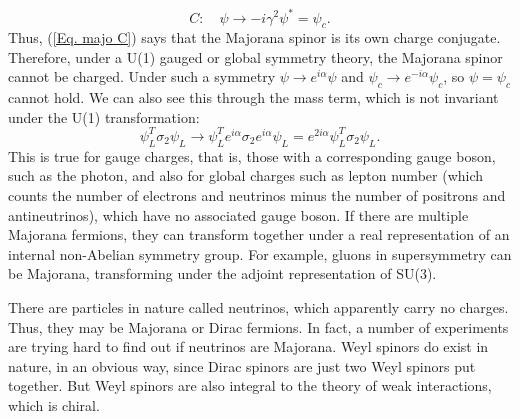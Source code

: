 \documentclass[11pt]{article}
\theoremstyle{definition}
\begin{document}
\begin{equation}
    C:\quad \psi \rightarrow -i\gamma^2\psi^*  = \psi_c.
\end{equation}
Thus, (\ref{Eq. majo C}) says that the Majorana spinor is its own charge conjugate. Therefore, under a U(1) gauged or global symmetry theory, the Majorana spinor cannot be charged. Under such a symmetry \(\psi \rightarrow e^{i\alpha}\psi\) and \(\psi_c \rightarrow e^{-i\alpha}\psi_c\), so \(\psi = \psi_c\) cannot hold. We can also see this through the mass term, which is not invariant under the U(1) transformation:
\begin{equation}
\psi_L^T\sigma_2\psi_L \rightarrow \psi_L^Te^{i\alpha}\sigma_2e^{i\alpha}\psi_L = e^{2i\alpha}\psi_L^T\sigma_2\psi_L.
\end{equation}
This is true for gauge charges, that is, those with a corresponding gauge boson, such as the photon, and also for global charges such as lepton number (which counts the number of electrons and neutrinos minus the number of positrons and antineutrinos), which have no associated gauge boson. If there are multiple Majorana fermions, they can transform together under a real representation of an internal non-Abelian symmetry group. For example, gluons in supersymmetry can be Majorana, transforming under the adjoint representation of SU(3).

There are particles in nature called neutrinos, which apparently carry no charges. Thus, they may be Majorana or Dirac fermions. In fact, a number of experiments are trying hard to find out if neutrinos are Majorana. Weyl spinors do exist in nature, in an obvious way, since Dirac spinors are just two Weyl spinors put together. But Weyl spinors are also integral to the theory of weak interactions, which is chiral.
\end{document}
